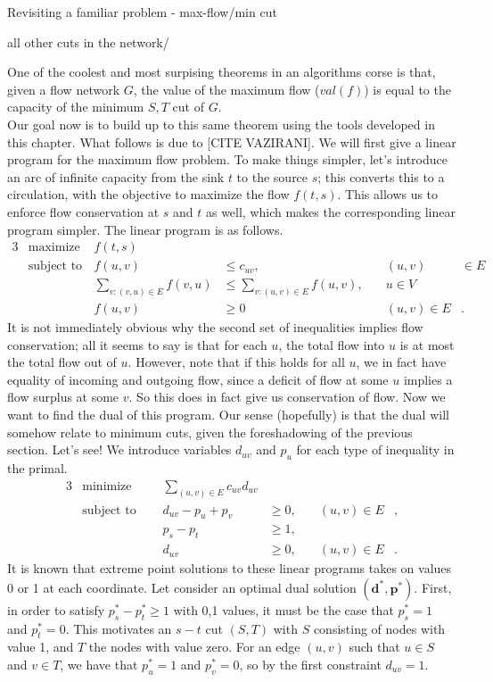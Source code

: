 \documentclass[11pt]{article}
\renewcommand{\'}{^{'}}
\newenvironment{definition}[2][Definition]{\begin{trivlist}
\item[\hskip \labelsep {\bfseries #1}\hskip \labelsep {\bfseries #2.}]}{\end{trivlist}}
\begin{document}
\begin{section}{Revisiting a familiar problem - max-flow/min cut}
\begin{definition}{(Cut)}
		all other cuts in the network/
	\end{definition}
	One of the coolest and most surpising theorems in an algorithms corse is that, given a flow 
	network $G$, the value of the maximum flow ($val(f)$) is equal to the capacity of the minimum 
	$S,T$ cut of $G$.\\
	Our goal now is to build up to this same theorem using the tools developed in this chapter. 
	What follows is due to [CITE VAZIRANI]. We will first give a linear program for the 
	maximum flow problem. To make things simpler, let's introduce an arc of infinite capacity 
	from the sink $t$ to the source $s$; this converts this to a circulation, with the objective to 
	maximize the flow $f(t,s)$. This allows us to enforce flow conservation at $s$ and $t$ as well, 
	which makes the corresponding linear program simpler. The linear program is as follows.
	\begin{alignat*}{3}
		& \text{maximize } & f(t,s)\\
		& \text{subject to } & f(u,v) &\leq c_{uv}, &\quad (u,v)&\in E\\ 
				     && \sum_{v:(v,u)\in E} f(v,u) & \leq \sum_{v:(u,v)\in E} f(u,v), &
				     	\quad u\in V &\\
				     && f(u,v) &\geq 0 &\quad (u,v)\in E &.
	\end{alignat*}
	It is not immediately obvious why the second set of inequalities implies flow conservation; all 
	it seems to say is that for each $u$, the total flow into $u$ is at most the total flow out 
	of $u$. However, note that if this holds for all $u$, we in fact have equality of incoming and 
	outgoing flow, since a deficit of flow at some $u$ implies a flow surplus at some $v$. So 
	this does in fact give us conservation of flow. Now we want to find the dual of this program. 
	Our sense (hopefully) is that the dual will somehow relate to minimum cuts, given the 
	foreshadowing of the previous section. Let's see! We introduce variables $d_{uv}$ and $p_u$ for 
	each type of inequality in the primal.
	\begin{alignat}{3}
		& \text{minimize } & \sum_{(u,v)\in E} c_{uv} d_{uv}& \\
		& \text{subject to } \quad & d_{uv} - p_u + p_v & \geq 0, & \quad (u,v)\in E &, \\
				    && p_s - p_t & \geq 1, & \\
				    && d_{uv} & \geq 0, & \quad (u,v) \in E &.
	\end{alignat}
	It is known that extreme point solutions to these linear programs takes on values 0 or 1 at 
	each coordinate. Let consider an optimal dual solution $(\mathbf{d}^{*},\mathbf{p}^{*})$. 
	First, in order to satisfy $p_s^{*} - p_{t}^{*} \geq 1$ with 0,1 values, it must be the case 
	that $p_s^{*} = 1$ and $p_t^{*} = 0$. This motivates an $s-t$ cut $(S,T)$ with $S$ consisting 
	of nodes with value 1, and $T$ the nodes with value zero. For an edge $(u,v)$ such that 
	$u\in S$ and $v\in T$, we have that $p_u^{*} = 1$ and $p_v^{*} = 0$, so by the first constraint 
	$d_{uv} = 1$. 
\end{section}
\end{document}
